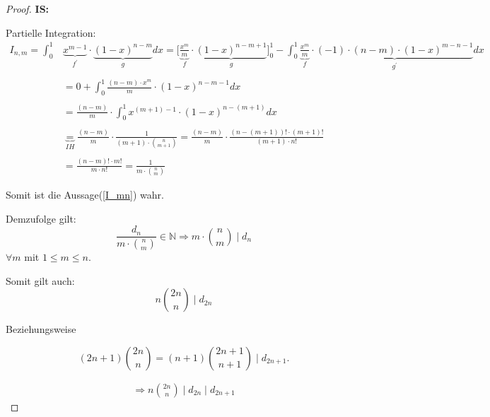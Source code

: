 \documentclass[12pt,oneside]{article}
\theoremstyle{remark}
\theoremstyle{definition}
\begin{document}
\begin{proof}
\textbf{IS: }

Partielle Integration:\newline\newline
\begin{align*}
    I_{n,m} = \int_{0}^{1} &\underbrace{x^{m - 1}}_{f^{'}} \cdot \underbrace{(1 - x)^{n - m}}_{g} dx =\Big[ \underbrace{\frac{x^{m}}{m}}_{f} \cdot \underbrace{(1 - x)^{n - m + 1}}_{g}\Big]_0^1 - \int_{0}^{1} \underbrace{\frac{x^{m}}{m}}_{f} \cdot \underbrace{(-1 )\cdot (n - m) \cdot (1 -x)^{m - n - 1}}_{g^{'}} dx \\
    \\
    &= 0 +  \int_{0}^{1} \frac{(n - m) \cdot x^{m}}{m} \cdot (1 - x)^{n - m - 1} dx \\
    \\
    &= \frac{(n - m )}{m} \cdot \int_{0}^{1} x^{(m + 1) - 1} \cdot (1-x)^{n - (m + 1)} dx \\
    \\
    &\underbrace{=}_{IH} \frac{(n - m )}{m} \cdot \frac{1}{(m + 1) \cdot {n \choose m + 1}} = \frac{(n - m)}{m} \cdot \frac{(n - (m + 1))! \cdot (m + 1)!}{(m + 1) \cdot n!} \\ 
    \\ 
    &= \frac{(n - m )! \cdot m!}{m \cdot n!} = \frac{1}{m \cdot {n \choose m}} 
\end{align*}

Somit ist die Aussage(\ref{I_mn}) wahr.\newline 

Demzufolge gilt: 
\begin{equation}
    \frac{d_{n}}{m \cdot {n \choose m}} \in \mathbb{N} \Rightarrow  m \cdot {n \choose m} \mid d_{n}
\end{equation}
$\forall m $ mit $1 \leq m \leq n $.\newline

Somit gilt auch: 
\begin{equation}\label{d2n}
    n {2n\choose n} \mid d_{2n}
\end{equation}

Beziehungsweise 

\begin{equation}\label{d2n1}
    (2n + 1) {2n \choose n} = (n + 1) {2n + 1 \choose n + 1} \mid d_{2n + 1}. 
\end{equation}

\begin{align*}
\Rightarrow n {2n \choose n}\mid d_{2n}\mid d_{2n + 1}
\end{align*}
\smallskip


\end{proof}
\end{document}
